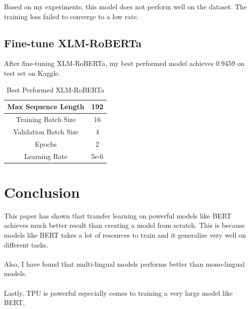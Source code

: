 \documentclass[11pt,a4paper]{article}
\begin{document}
Based on my experiments, this model does not perform well on the dataset. The training loss failed to converge to a low rate.

\subsection{Fine-tune XLM-RoBERTa}

After fine-tuning XLM-RoBERTa, my best performed model achieves 0.9459 on test set on Kaggle.\\

\begin{table}[!htbp]
	\centering
	\begin{tabular}{|c|c|}
		\hline
		{Max Sequence Length}   & 192  \\ \hline
		{Training Batch Size}   & 16   \\ \hline
		{Validation Batch Size} & 4    \\ \hline
		{Epochs}                & 2    \\ \hline
		{Learning Rate}         & 5e-6 \\ \hline
	\end{tabular}
	\caption{\label{table:my-label} Best Performed XLM-RoBERTa}
\end{table}


\section{Conclusion}

This paper has shown that transfer learning on powerful models like BERT achieves much better result than creating a model from scratch. This is because models like BERT takes a lot of resources to train and it generalize very well on different tasks.\\
\\
Also, I have found that multi-lingual models performs better than mono-lingual models.\\
\\
Lastly, TPU is powerful especially comes to training a very large model like BERT.\\


\newpage
\

\end{document}
